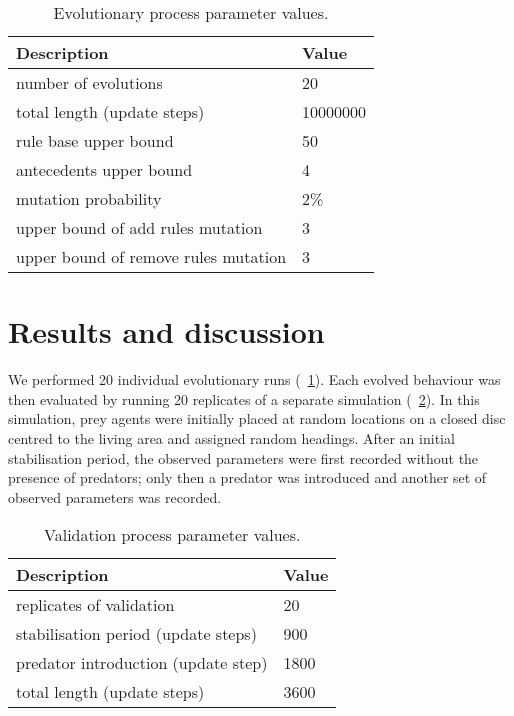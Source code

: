 \begin{table}
  \caption{Evolutionary process parameter values.}
  \label{tab:GA}
  \begin{tabular}{ll}
    \toprule
    Description & Value \\
    \midrule
    number of evolutions & 20 \\
    total length (update steps) & \num{10000000} \\
    rule base upper bound & 50 \\
    antecedents upper bound & 4 \\
    mutation probability & 2\% \\
    upper bound of add rules mutation & 3 \\
    upper bound of remove rules mutation & 3 \\
    \bottomrule
  \end{tabular}
\end{table}

\section{Results and discussion}

We performed 20 individual evolutionary runs (\tablename~\ref{tab:GA}). Each evolved behaviour was then evaluated by running 20 replicates of a separate simulation (\tablename~\ref{tab:EVA}). In this simulation, prey agents were initially placed at random locations on a closed disc centred to the living area and assigned random headings. After an initial stabilisation period, the observed parameters were first recorded without the presence of predators; only then a predator was introduced and another set of observed parameters was recorded.

\begin{table}
  \caption{Validation process parameter values.}
  \label{tab:EVA}
  \begin{tabular}{ll}
    \toprule
    Description & Value \\
    \midrule
    replicates of validation & 20 \\
    stabilisation period (update steps) & 900 \\
    predator introduction (update step) & \num{1800} \\
    total length (update steps) & \num{3600} \\
    \bottomrule
  \end{tabular}
\end{table}

